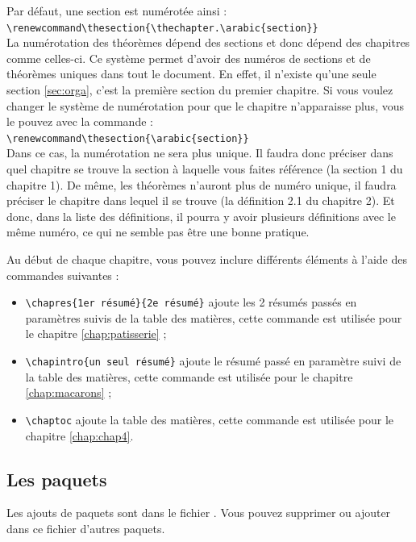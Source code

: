 \begin{remark}
  Par défaut, une section est numérotée ainsi :\\\verb|\renewcommand\thesection{\thechapter.\arabic{section}}|\\La numérotation des théorèmes dépend des sections et donc dépend des chapitres comme celles-ci. Ce système permet d'avoir des numéros de sections et de théorèmes uniques dans tout le document. En effet, il n'existe qu'une seule section \ref{sec:orga}, c'est la première section du premier chapitre. Si vous voulez changer le système de numérotation pour que le chapitre n'apparaisse plus, vous le pouvez avec la commande :\\\verb|\renewcommand\thesection{\arabic{section}}|\\Dans ce cas, la numérotation ne sera plus unique. Il faudra donc préciser dans quel chapitre se trouve la section à laquelle vous faites référence (la section 1 du chapitre 1). De même, les théorèmes n'auront plus de numéro unique, il faudra préciser le chapitre dans lequel il se trouve (la définition 2.1 du chapitre 2). Et donc, dans la liste des définitions, il pourra y avoir plusieurs définitions avec le même numéro, ce qui ne semble pas être une bonne pratique.
\end{remark}

Au début de chaque chapitre, vous pouvez inclure différents éléments à l'aide des commandes suivantes :

\begin{itemize}
  \item \verb|\chapres{1er résumé}{2e résumé}| ajoute les 2 résumés passés en paramètres suivis de la table des matières, cette commande est utilisée pour le chapitre \ref{chap:patisserie} ;
  \item \verb|\chapintro{un seul résumé}| ajoute le résumé passé en paramètre suivi de la table des matières, cette commande est utilisée pour le chapitre \ref{chap:macarons} ;
  \item \verb|\chaptoc| ajoute la table des matières, cette commande est utilisée pour le chapitre \ref{chap:chap4}.
\end{itemize}

\subsection{Les paquets}
Les ajouts de paquets sont dans le fichier . Vous pouvez supprimer ou ajouter dans ce fichier d'autres paquets.

